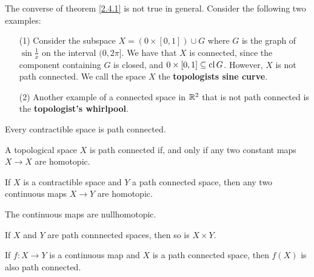 \begin{example}\label{2.9}
    The converse of theorem \ref{2.4.1} is not true in general. Consider the
    following two examples:
    \begin{enumerate}
        \item[(1)] Consider the subspace $X=(0 \times [0,1]) \cup G$ where $G$
            is the graph of  $\sin{\frac{1}{x}}$ on the interval $(0,2\pi]$. We
            have that $X$ is connected, since the component containing $G$ is
            closed, and $0 \times [0,1] \subseteq \operatorname{cl}{G}$. However, $X$ is not
            path connected. We call the space $X$ the  \textbf{topologists sine
            curve}.

        \item[(2)] Another example of a connected space in $\mathbb{R}^2$ that is not
            path connected is the  \textbf{topologist's whirlpool}.
    \end{enumerate}
\end{example}

\begin{lemma}\label{2.4.3}
    Every contractible space is path connected.
\end{lemma}

\begin{lemma}\label{2.2.4}
    A topological space $X$ is path connected if, and only if any two
    constant maps  $X \xrightarrow{} X$ are homotopic.
\end{lemma}

\begin{lemma}\label{2.2.5}
    If $X$ is a contractible space and  $Y$ a path connected space, then any two
    continuous maps  $X \xrightarrow{} Y$ are homotopic.
\end{lemma}
\begin{corollary}
    The continuous maps are nullhomotopic.
\end{corollary}

\begin{lemma}\label{2.4.6}
    If $X$ and  $Y$ are path connnected spaces, then so is  $X \times Y$.
\end{lemma}

\begin{lemma}\label{2.4.7}
    If $f:X \xrightarrow{} Y$ is a continuous map and $X$ is a path connected
    space, then  $f(X)$ is also path connected.
\end{lemma}

